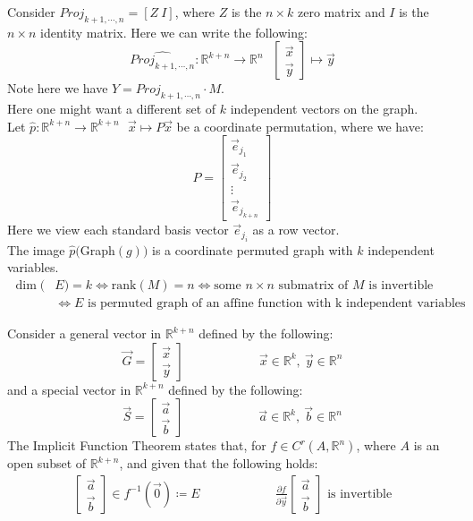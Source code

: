\documentclass[15pt]{book}
\theoremstyle{break}
\theoremstyle{break}
\newcommand{\R}{\mathbb{R}}
\begin{document}
Consider $Proj_{k+1,\cdots,n} = [Z\ I]$, where $Z$ is the $n \times k$ zero matrix and $I$ is the $n \times n$ identity matrix. Here we can write the following: $$\hat{Proj_{k+1,\cdots,n}}:\R^{k+n} \to \R^n \ \ \ \begin{bmatrix}\vec{x}\\\vec{y}\end{bmatrix} \mapsto \vec{y}$$
Note here we have $Y = Proj_{k+1,\cdots,n}\cdot M$.\\

Here one might want a different set of $k$ independent vectors on the graph.\\ Let $\hat{p}: \R^{k+n} \to \R^{k+n} \ \ \ \vec{x}\mapsto P\vec{x}$ be a coordinate permutation, where we have: 
$$P = \begin{bmatrix}
 \vec{e}_{j_1} \\ \vec{e}_{j_2} \\ \vdots \\ \vec{e}_{j_{k+n}}
\end{bmatrix}$$
Here we view each standard basis vector $\vec{e}_{j_i}$ as a row vector.\\
The image $\hat{p}($Graph$(g))$ is a coordinate permuted graph with $k$ independent variables. 
\begin{align*}
\dim(&E) = k \iff \text{rank}(M) = n \iff \text{some }n\times n\text{ submatrix of }M\text{ is invertible}\\
&\iff E\text{ is permuted graph of an affine function with k independent variables}
\end{align*}

Consider a general vector in $\R^{k+n}$ defined by the following:
$$\vec{G} = \begin{bmatrix}
\vec{x} \\ \vec{y}
\end{bmatrix}\qquad\qquad\qquad\vec{x}\in \R^k,\ \vec{y}\in \R^n
$$
and a special vector in $\R^{k+n}$ defined by the following:
$$\vec{S} = \begin{bmatrix}
\vec{a} \\ \vec{b}
\end{bmatrix}\qquad\qquad\qquad\vec{a}\in \R^k,\ \vec{b}\in \R^n
$$
The Implicit Function Theorem states that, for $f \in C^r(A,\R^n)$, where $A$ is an open subset of $\R^{k+n}$, and given that the following holds:
\begin{align*}
\begin{bmatrix}
\vec{a}\\\vec{b}
\end{bmatrix} \in f^{-1}(\vec{0}) \coloneqq E \qquad\qquad\qquad \frac{\partial f}{\partial \vec{y}}\begin{bmatrix}
\vec{a}\\\vec{b}
\end{bmatrix} \text{ is invertible}
\end{align*}
\end{document}

